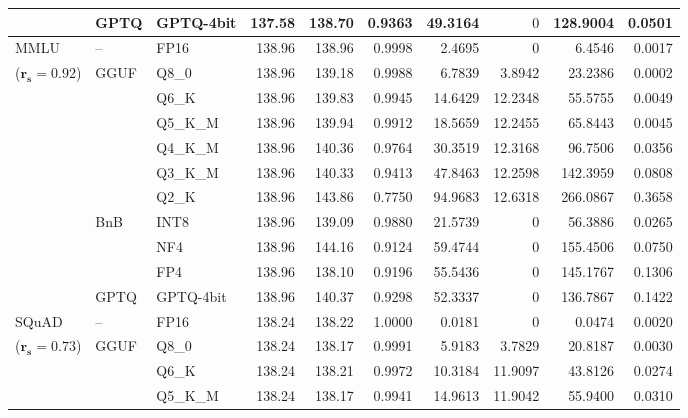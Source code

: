 \begin{longtable}{ll l rrrrrrr}
 & GPTQ & GPTQ-4bit & 137.58 & 138.70 & \cellcolor{red!18} 0.9363 & \cellcolor{red!18} 49.3164 & \cellcolor{cyan!12} $0$ & \cellcolor{red!18} 128.9004 & \cellcolor{red!18} 0.0501 \\
\midrule
MMLU & -- & FP16 & 138.96 & 138.96 & 0.9998 & 2.4695 & \cellcolor{cyan!12} $0$ & 6.4546 & 0.0017 \\
{\small ($\mathbf{r_s{=}0.92}$)} & GGUF & Q8\_0 & 138.96 & 139.18 & 0.9988 & 6.7839 & 3.8942 & 23.2386 & 0.0002 \\
 &  & Q6\_K & 138.96 & 139.83 & 0.9945 & 14.6429 & 12.2348 & 55.5755 & 0.0049 \\
 &  & Q5\_K\_M & 138.96 & 139.94 & 0.9912 & 18.5659 & 12.2455 & 65.8443 & 0.0045 \\
 &  & Q4\_K\_M & 138.96 & 140.36 & 0.9764 & 30.3519 & 12.3168 & 96.7506 & 0.0356 \\
 &  & Q3\_K\_M & 138.96 & 140.33 & \cellcolor{red!18} 0.9413 & \cellcolor{red!18} 47.8463 & 12.2598 & \cellcolor{red!18} 142.3959 & \cellcolor{red!18} 0.0808 \\
 &  & Q2\_K & 138.96 & 143.86 & \cellcolor{red!35} 0.7750 & \cellcolor{red!35} 94.9683 & 12.6318 & \cellcolor{red!35} 266.0867 & \cellcolor{red!35} 0.3658 \\
 & BnB & INT8 & 138.96 & 139.09 & 0.9880 & 21.5739 & \cellcolor{cyan!12} $0$ & 56.3886 & 0.0265 \\
 &  & NF4 & 138.96 & 144.16 & \cellcolor{red!18} 0.9124 & \cellcolor{red!18} 59.4744 & \cellcolor{cyan!12} $0$ & \cellcolor{red!18} 155.4506 & \cellcolor{red!18} 0.0750 \\
 &  & FP4 & 138.96 & 138.10 & \cellcolor{red!18} 0.9196 & \cellcolor{red!18} 55.5436 & \cellcolor{cyan!12} $0$ & \cellcolor{red!18} 145.1767 & \cellcolor{red!18} 0.1306 \\
 & GPTQ & GPTQ-4bit & 138.96 & 140.37 & \cellcolor{red!18} 0.9298 & \cellcolor{red!18} 52.3337 & \cellcolor{cyan!12} $0$ & \cellcolor{red!18} 136.7867 & \cellcolor{red!18} 0.1422 \\
\midrule
SQuAD & -- & FP16 & 138.24 & 138.22 & 1.0000 & 0.0181 & \cellcolor{cyan!12} $0$ & 0.0474 & 0.0020 \\
{\small ($\mathbf{r_s{=}0.73}$)} & GGUF & Q8\_0 & 138.24 & 138.17 & 0.9991 & 5.9183 & 3.7829 & 20.8187 & 0.0030 \\
 &  & Q6\_K & 138.24 & 138.21 & 0.9972 & 10.3184 & 11.9097 & 43.8126 & 0.0274 \\
 &  & Q5\_K\_M & 138.24 & 138.17 & 0.9941 & 14.9613 & 11.9042 & 55.9400 & 0.0310 \\

\end{longtable}
